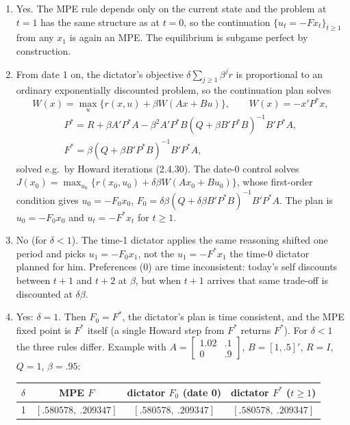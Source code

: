 \documentclass[12pt, letterpaper]{article}
\begin{document}
\begin{tcolorbox}[evenbox,title={Exercise 2.30 \quad Phelps and Pollak (1968) Meet Howard}]
\begin{enumerate}
(today's self discounts tomorrow more). With $\delta=1$ it \emph{is} (2.4.30). With $\delta<1$ the
iteration is a fixed-point search for a game equilibrium, not an optimisation, so Howard's monotone
improvement and convergence guarantees do not carry over. In the notebook example it converges in
10 ($\delta=.8$) and 14 ($\delta=.6$) iterations.
\item Yes. The MPE rule depends only on the current state and the problem at $t=1$ has the same
structure as at $t=0$, so the continuation $\{u_t=-Fx_t\}_{t\ge1}$ from any $x_1$ is again an MPE.
The equilibrium is subgame perfect by construction.
\item From date 1 on, the dictator's objective $\delta\sum_{j\ge1}\beta^jr$ is proportional to an ordinary
exponentially discounted problem, so the continuation plan solves
\[
W(x)=\max_u\{r(x,u)+\beta W(Ax+Bu)\},\qquad W(x)=-x'P^*x,
\]
\[
\begin{gathered}
P^*=R+\beta A'P^*A-\beta^2A'P^*B(Q+\beta B'P^*B)^{-1}B'P^*A,\\
F^*=\beta(Q+\beta B'P^*B)^{-1}B'P^*A,
\end{gathered}
\]
solved e.g.\ by Howard iterations (2.4.30). The date-0 control solves
$J(x_0)=\max_{u_0}\{r(x_0,u_0)+\delta\beta W(Ax_0+Bu_0)\}$, whose first-order condition gives
$u_0=-F_0x_0$, $F_0=\delta\beta(Q+\delta\beta B'P^*B)^{-1}B'P^*A$. The plan is $u_0=-F_0x_0$ and
$u_t=-F^*x_t$ for $t\ge1$.
\item No (for $\delta<1$). The time-1 dictator applies the same reasoning shifted one period and
picks $u_1=-F_0x_1$, not the $u_1=-F^*x_1$ the time-0 dictator planned for him. Preferences (0) are
time inconsistent: today's self discounts between $t+1$ and $t+2$ at $\beta$, but when $t+1$ arrives
that same trade-off is discounted at $\delta\beta$.
\item Yes: $\delta=1$. Then $F_0=F^*$, the dictator's plan is time consistent, and the MPE fixed point
is $F^*$ itself (a single Howard step from $F^*$ returns $F^*$). For $\delta<1$ the three rules differ.
Example with $A=\begin{bmatrix}1.02&.1\\0&.9\end{bmatrix}$, $B=[1,.5]'$, $R=I$, $Q=1$, $\beta=.95$:
\begin{center}\small
\begin{tabular}{@{}lccc@{}}
\toprule
$\delta$ & MPE $F$ & dictator $F_0$ (date 0) & dictator $F^*$ ($t\ge1$)\\
\midrule
1 & $[.580578,\ .209347]$ & $[.580578,\ .209347]$ & $[.580578,\ .209347]$\\

\end{tabular}
\end{center}
\end{enumerate}
\end{tcolorbox}
\end{document}
